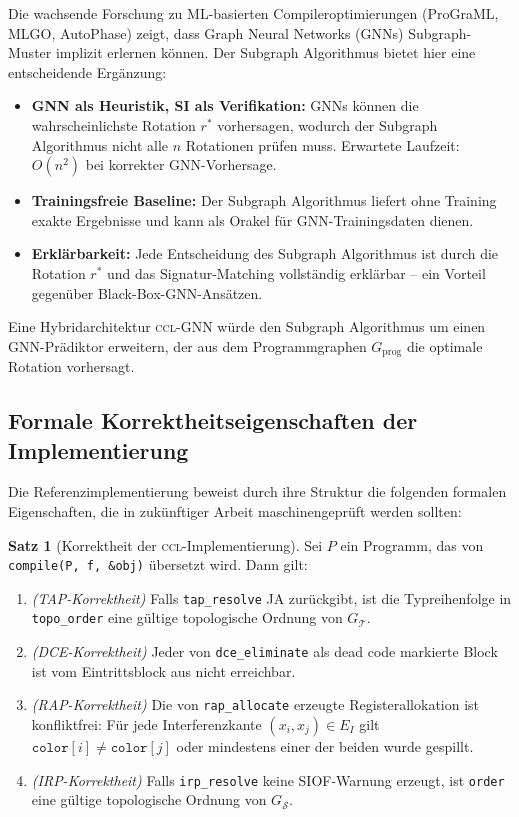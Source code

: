 ﻿\documentclass[a4paper,12pt]{article}
\theoremstyle{definition}
\newtheorem{satz}{Satz}
\begin{document}
Die wachsende Forschung zu ML-basierten Compileroptimierungen (ProGraML,
MLGO, AutoPhase) zeigt, dass Graph Neural Networks (GNNs) Subgraph-Muster
implizit erlernen können. Der Subgraph Algorithmus bietet hier eine
entscheidende Ergänzung:

\begin{itemize}
	\item \textbf{GNN als Heuristik, SI als Verifikation:} GNNs
	können die wahrscheinlichste Rotation $r^*$ vorhersagen,
	wodurch der Subgraph Algorithmus nicht alle $n$ Rotationen
	prüfen muss. Erwartete Laufzeit: $O(n^2)$ bei korrekter
	GNN-Vorhersage.
	\item \textbf{Trainingsfreie Baseline:} Der Subgraph Algorithmus
	liefert ohne Training exakte Ergebnisse und kann als
	Orakel für GNN-Trainingsdaten dienen.
	\item \textbf{Erklärbarkeit:} Jede Entscheidung des Subgraph
	Algorithmus ist durch die Rotation $r^*$ und das
	Signatur-Matching vollständig erklärbar -- ein Vorteil
	gegenüber Black-Box-GNN-Ansätzen.
\end{itemize}

Eine Hybridarchitektur \textsc{ccl-GNN} würde den Subgraph Algorithmus
um einen GNN-Prädiktor erweitern, der aus dem
Programmgraphen $G_{\mathrm{prog}}$ die optimale Rotation vorhersagt.

\subsection{Formale Korrektheitseigenschaften der Implementierung}
\label{sec:ausblick-formal}

Die Referenzimplementierung beweist durch ihre Struktur die folgenden
formalen Eigenschaften, die in zukünftiger Arbeit maschinengeprüft
werden sollten:

\begin{satz}[Korrektheit der \textsc{ccl}-Implementierung]
	\label{satz:ccl-correct}
	Sei $P$ ein Programm, das von \texttt{compile(P, f, \&obj)} übersetzt
	wird. Dann gilt:
	\begin{enumerate}
		\item \emph{(TAP-Korrektheit)} Falls \texttt{tap\_resolve} JA
		zurückgibt, ist die Typreihenfolge in \texttt{topo\_order}
		eine gültige topologische Ordnung von $G_{\mathcal{T}}$.
		\item \emph{(DCE-Korrektheit)} Jeder von \texttt{dce\_eliminate}
		als dead code markierte Block ist vom Eintrittsblock aus nicht
		erreichbar.
		\item \emph{(RAP-Korrektheit)} Die von \texttt{rap\_allocate}
		erzeugte Registerallokation ist konfliktfrei: Für jede
		Interferenzkante $(x_i, x_j) \in E_I$ gilt
		$\texttt{color}[i] \neq \texttt{color}[j]$ oder mindestens
		einer der beiden wurde gespillt.
		\item \emph{(IRP-Korrektheit)} Falls \texttt{irp\_resolve} keine
		SIOF-Warnung erzeugt, ist \texttt{order} eine gültige
		topologische Ordnung von $G_{\mathcal{S}}$.
	\end{enumerate}
\end{satz}
\end{document}
